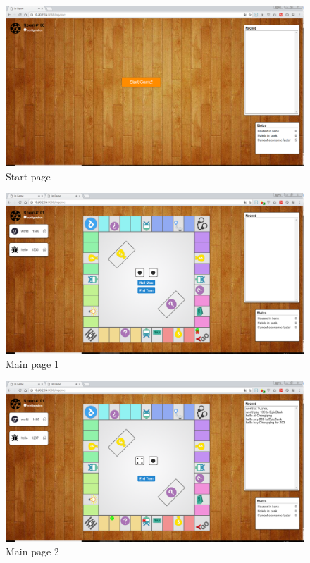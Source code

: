 \documentclass[a4paper,11pt]{article}
\begin{document}
\begin{figure}[H]
\includegraphics[scale=0.32]{image/start_game.png}
\caption{Start page}
\end{figure}
\begin{figure}[H]
\includegraphics[scale=0.32]{image/ingame1.png}
\caption{Main page 1}
\end{figure}
\begin{figure}[H]
\includegraphics[scale=0.32]{image/ingame3.png}
\caption{Main page 2}
\end{figure}
\end{document}
